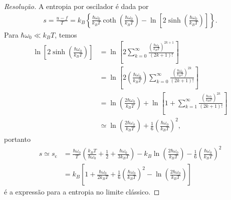 \begin{proof}[Resolução]
    A entropia por oscilador é dada por
    \begin{align*}
        s = \frac{u - f}{T} = k_B\left\{\frac{\hbar \omega_0}{k_BT}\coth\left(\frac{\hbar\omega_0}{k_BT}\right)- \ln\left[2\sinh\left(\frac{\hbar \omega_0}{k_B T}\right)\right]\right\}.
    \end{align*}
    Para \(\hbar \omega_0 \ll k_B T\), temos
    \begin{align*}
        \ln\left[2\sinh\left(\frac{\hbar \omega_0}{k_B T}\right)\right] &= \ln\left[2 \sum_{k=0}^\infty \frac{\left(\frac{\hbar\omega_0}{k_BT}\right)^{2k+1}}{(2k+1)!}\right]\\
                                                                        &= \ln\left[2\left(\frac{\hbar\omega_0}{k_BT}\right)\sum_{k=0}^\infty \frac{\left(\frac{\hbar\omega_0}{k_BT}\right)^{2k}}{(2k+1)!}\right]\\
                                                                        &= \ln\left(\frac{2\hbar\omega_0}{k_BT}\right) + \ln\left[1 + \sum_{k=1}^\infty\frac{\left(\frac{\hbar\omega_0}{k_BT}\right)^{2k}}{(2k+1)!}\right]\\
                                                                        &\simeq \ln\left(\frac{2\hbar\omega_0}{k_BT}\right) + \frac16\left(\frac{\hbar\omega_0}{k_BT}\right)^2,
    \end{align*}
    portanto
    \begin{align*}
        s \simeq s_\mathrm{c} &= \frac{\hbar \omega_0}{T} \left(\frac{k_B T}{\hbar\omega_0} + \frac{1}{2} + \frac{\hbar \omega_0}{3 k_B T}\right) - k_B\ln\left(\frac{2\hbar\omega_0}{k_BT}\right) - \frac16\left(\frac{\hbar\omega_0}{k_BT}\right)^2\\
                              &= k_B \left[1 + \frac{\hbar\omega_0}{2k_B T} + \frac16\left(\frac{\hbar \omega_0}{k_B T}\right)^2 - \ln\left(\frac{2\hbar \omega_0}{k_B T}\right)\right]
    \end{align*}
    é a expressão para a entropia no limite clássico.


\end{proof}
